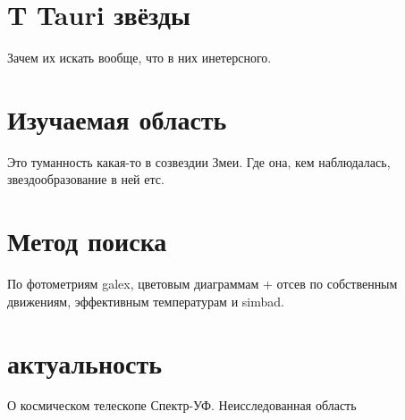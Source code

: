 

\section{T Tauri звёзды}

Зачем их искать вообще, что в них инетерсного.

\section{Изучаемая область}

Это туманность какая-то в созвездии Змеи. Где она, кем наблюдалась, звездообразование в ней етс.

\section{Метод поиска}

По фотометриям galex, цветовым диаграммам + отсев по собственным движениям, эффективным температурам и simbad.

\section{актуальность}

О космическом телескопе Спектр-УФ. Неисследованная область